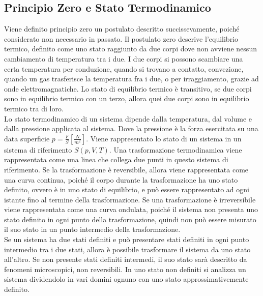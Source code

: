 \documentclass{article}
\numberwithin{equation}{subsection}
\begin{document}
\subsection{Principio Zero e Stato Termodinamico}
Viene definito principio zero un postulato descritto 
succissevamente, poiché considerato non necessario in passato. 
Il postulato zero descrive l'equilibrio termico, definito 
come uno stato raggiunto da due corpi dove non avviene nessun 
cambiamento di temperatura tra i due. I due corpi si possono scambiare una certa temperatura per conduzione, quando si trovano a contatto, convezione, quando un gas trasferisce la 
temperatura fra i due, o per irraggiamento, grazie ad onde elettromagnatiche. Lo stato di equilibrio 
termico è transitivo, se due corpi sono in equilibrio termico 
con un terzo, allora quei due corpi sono in equilibrio termico 
tra di loro. \\
Lo stato termodinamico di un sistema dipende dalla temperatura, 
dal volume e dalla pressione applicata al sistema. Dove la pressione 
è la forza esercitata su una data superficie $p=\displaystyle\frac{F}{S}\left[\displaystyle\frac{N}{m^2}\right]$. 
Viene rappresentato lo stato di un sistema in un sistema di 
riferimento $S(p,V,T)$. Una trasformazione termodinamica viene 
rappresentata come una linea che collega due punti in questo 
sistema di riferimento. Se la trasformazione è reversibile, 
allora viene rappresentata come una curva continua, poiché 
il corpo durante la trasformazione ha uno stato definito, ovvero 
è in uno stato di equilibrio, e può essere rappresentato ad ogni 
istante fino al termine della trasformazione. Se una trasformazione 
è irreversibile viene rappresentata come una curva ondulata, 
poiché il sistema non presenta uno stato definito in ogni 
punto della trasformazione, quindi non può essere misurato il suo 
stato in un punto intermedio della trasformazione. \\
Se un sistema ha due stati definiti e può presentare stati 
definiti in ogni punto intermedio tra i due stati, allora è 
possibile trasformare il sistema da uno stato all'altro. Se non 
presente stati definiti intermedi, il suo stato sarà descritto da 
fenomeni microscopici, non reversibili. In uno stato non 
definiti si analizza un sistema dividendolo in vari domini 
ognuno con uno stato approssimativemente definito. 

\begin{center}\end{center}
\end{document}
